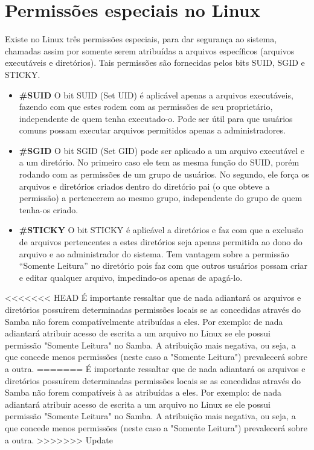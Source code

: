 
\section{Permissões especiais no Linux}

Existe no Linux três permissões especiais, para dar segurança ao sistema, chamadas assim por somente serem atribuídas a arquivos específicos (arquivos executáveis e diretórios). Tais permissões são fornecidas pelos bits SUID, SGID e STICKY.

  \begin{itemize}
    \item \textbf{\#SUID} O bit SUID (Set UID) é aplicável apenas a arquivos executáveis, fazendo com que estes rodem com as permissões de seu proprietário, independente de quem tenha executado-o. Pode ser útil para que usuários comuns possam executar arquivos permitidos apenas a administradores.

    \item \textbf{\#SGID} O bit SGID (Set GID) pode ser aplicado a um arquivo executável e a um diretório. No primeiro caso ele tem as mesma função do SUID, porém rodando com as permissões de um grupo de usuários. No segundo, ele força os arquivos e diretórios criados dentro do diretório pai (o que obteve a permissão) a pertencerem ao mesmo grupo, independente do grupo de quem tenha-os criado.

    \item \textbf{\#STICKY} O bit STICKY é aplicável a diretórios e faz com que a exclusão de arquivos pertencentes a estes diretórios seja apenas permitida ao dono do arquivo e ao administrador do sistema. Tem vantagem sobre a permissão “Somente Leitura” no diretório pois faz com que outros usuários possam criar e editar qualquer arquivo, impedindo-os apenas de apagá-lo.
  \end{itemize}

<<<<<<< HEAD
É importante ressaltar que de nada adiantará os arquivos e diretórios possuírem determinadas permissões locais se as concedidas através do Samba não forem compatívelmente atribuídas a eles. Por exemplo: de nada adiantará atribuir acesso de escrita a um arquivo no Linux se ele possui permissão "Somente Leitura" no Samba. A atribuição mais negativa, ou seja, a que concede menos permissões (neste caso a "Somente Leitura") prevalecerá sobre a outra.
=======
É importante ressaltar que de nada adiantará os arquivos e diretórios possuírem determinadas permissões locais se as concedidas através do Samba não forem compatíveis à as atribuídas a eles. Por exemplo: de nada adiantará atribuir acesso de escrita a um arquivo no Linux se ele possui permissão "Somente Leitura" no Samba. A atribuição mais negativa, ou seja, a que concede menos permissões (neste caso a "Somente Leitura") prevalecerá sobre a outra.
>>>>>>> Update

